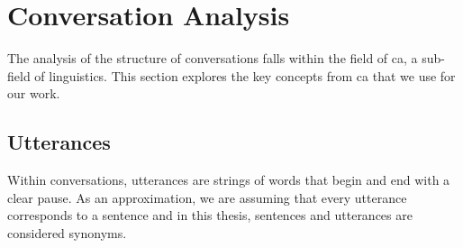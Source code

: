 \section{Conversation Analysis \label{sec: ca}}

The analysis of the structure of conversations falls within the field of \gls{ca}, a sub-field of linguistics. This section explores the key concepts from \gls{ca} that we use for our work. 
    \subsection{Utterances \label{ssec: utterances}}
        Within conversations, \glspl{utterance} are strings of words that begin and end with a clear pause. As an approximation, we are assuming that every \gls{utterance} corresponds to a sentence and in this thesis, sentences and \glspl{utterance} are considered synonyms.
        
